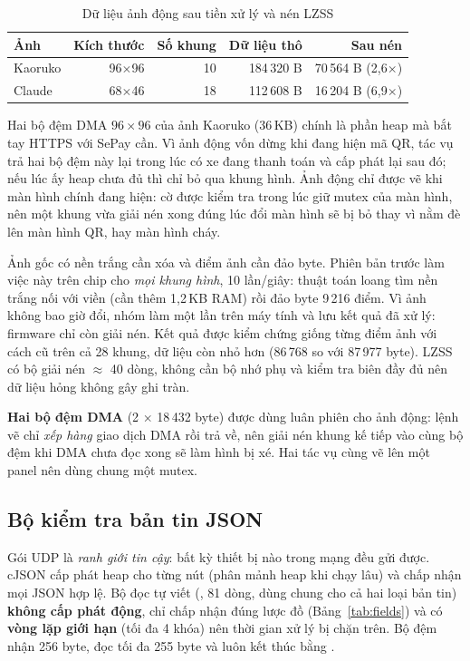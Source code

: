 \begin{table}[H]
\centering\small
\caption{Dữ liệu ảnh động sau tiền xử lý và nén LZSS}\label{tab:lzss}
\begin{tabular}{@{}lrrrr@{}}
\toprule
\textbf{Ảnh} & \textbf{Kích thước} & \textbf{Số khung} & \textbf{Dữ liệu thô} & \textbf{Sau nén} \\ \midrule
Kaoruko & 96$\times$96 & 10 & 184\,320 B & 70\,564 B (2,6$\times$) \\
Claude & 68$\times$46 & 18 & 112\,608 B & 16\,204 B (6,9$\times$) \\
\bottomrule
\end{tabular}
\end{table}
\noindent Hai bộ đệm DMA $96\times96$ của ảnh Kaoruko (36\,KB) chính là phần heap mà bắt tay HTTPS
với SePay cần. Vì ảnh động vốn dừng khi đang hiện mã QR, tác vụ  trả hai bộ đệm
này lại trong lúc có xe đang thanh toán và cấp phát lại sau đó; nếu lúc ấy heap chưa đủ thì chỉ bỏ
qua khung hình. Ảnh động chỉ được vẽ khi màn hình chính đang hiện: cờ  được
kiểm tra trong lúc giữ mutex của màn hình, nên một khung vừa giải nén xong đúng lúc đổi màn hình sẽ bị bỏ
thay vì nằm đè lên màn hình QR,  hay màn hình cháy.

\begin{lydo}
Ảnh gốc có nền trắng cần xóa và điểm ảnh cần đảo byte. Phiên bản trước làm việc
này trên chip cho \emph{mọi khung hình}, 10 lần/giây: thuật toán loang tìm nền trắng
nối với viền (cần thêm 1,2\,KB RAM) rồi đảo byte 9\,216 điểm. Vì ảnh không bao giờ
đổi, nhóm làm một lần trên máy tính và lưu kết quả đã xử lý: firmware chỉ còn giải
nén. Kết quả được kiểm chứng giống từng điểm ảnh với cách cũ trên cả 28 khung, dữ
liệu còn nhỏ hơn (86\,768 so với 87\,977 byte). LZSS có bộ giải nén $\approx$ 40 dòng,
không cần bộ nhớ phụ và kiểm tra biên đầy đủ nên dữ liệu hỏng không gây ghi tràn.
\end{lydo}

\textbf{Hai bộ đệm DMA} (2 $\times$ 18\,432 byte) được dùng luân phiên cho ảnh động:
lệnh vẽ chỉ \emph{xếp hàng} giao dịch DMA rồi trả về, nên giải nén khung kế tiếp vào
cùng bộ đệm khi DMA chưa đọc xong sẽ làm hình bị xé. Hai tác vụ cùng vẽ lên một
panel nên dùng chung một mutex.

\subsection{Bộ kiểm tra bản tin JSON}
\begin{lydo}
Gói UDP là \emph{ranh giới tin cậy}: bất kỳ thiết bị nào trong mạng đều gửi được.
cJSON cấp phát heap cho từng nút (phân mảnh heap khi chạy lâu) và chấp nhận mọi JSON
hợp lệ. Bộ đọc tự viết (, 81 dòng, dùng chung cho cả hai loại bản
tin) \textbf{không cấp phát động}, chỉ chấp nhận đúng lược đồ (Bảng~\ref{tab:fields})
và có \textbf{vòng lặp giới hạn} (tối đa 4 khóa) nên thời gian xử lý bị chặn trên.
Bộ đệm nhận 256 byte, đọc tối đa 255 byte và luôn kết thúc bằng .
\end{lydo}

